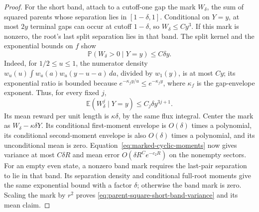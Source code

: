 \documentclass[11pt,letterpaper]{article}
\newcommand{\PP}{\mathbb P}\newcommand{\EE}{\mathbb E}
\begin{document}
\begin{proof}
For the short band, attach to a cutoff-one gap the mark
$W_\delta$, the sum of squared parents whose separation lies
in $[1-\delta,1]$. Conditional on $Y=y$, at most $2y$ terminal
gaps can occur at cutoff $1-\delta$, so $W_\delta\le Cy^3$.
If this mark is nonzero, the root's last split separation lies
in that band. The split kernel and the exponential bounds on
$f$ show
\[
 \PP(W_\delta>0\mid Y=y)\le C\delta y.
\]
Indeed, for $1/2\le u\le1$, the numerator density
$w_u(u)\int w_u(a)w_u(y-u-a)\,da$, divided by $w_1(y)$,
is at most $Cy$; its exponential ratio is bounded because
$e^{-\kappa_f y/u}\le e^{-\kappa_f y}$, where $\kappa_f$
is the gap-envelope exponent. Thus, for every fixed $j$,
\[
 \EE(W_\delta^j\mid Y=y)\le C_j\delta y^{3j+1}.
\]
Its mean reward per unit length is $\kappa\delta$, by the
same flux integral. Center the mark as
$W_\delta-\kappa\delta Y$.
Its conditional first-moment envelope is $O(\delta)$ times a
polynomial, its conditional second-moment envelope is also
$O(\delta)$ times a polynomial, and its unconditional mean is
zero. Equation~\eqref{eq:marked-cyclic-moments} now gives
variance at most $C\delta R$ and mean error
$O(\delta R^C e^{-c_2R})$ on the nonempty sectors.
For an empty even state, a nonzero band mark requires the
last-pair separation to lie in that band. Its separation density
and conditional full-root moments give the same exponential
bound with a factor $\delta$; otherwise the band mark is zero.
Scaling the mark by $r^2$ proves
\eqref{eq:parent-square-short-band-variance} and its mean claim.
\end{proof}
\end{document}
